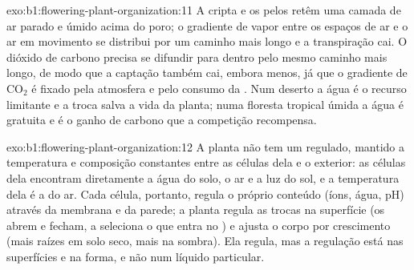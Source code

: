 \begin{solution}{exo:b1:flowering-plant-organization:11}
A cripta e os pelos retêm uma camada de ar parado e úmido acima do poro;
o gradiente de vapor entre os espaços de ar e o ar em movimento se
distribui por um caminho mais longo e a transpiração cai. O dióxido de
carbono precisa se difundir para dentro pelo mesmo caminho mais longo,
de modo que a captação também cai, embora menos, já que o gradiente de
$\mathrm{CO_2}$ é fixado pela atmosfera e pelo consumo da . Num
deserto a água é o recurso limitante e a troca salva a vida da planta;
numa floresta tropical úmida a água é gratuita e é o ganho de carbono
que a competição recompensa.
\end{solution}

\begin{solution}{exo:b1:flowering-plant-organization:12}
A planta não tem um  regulado, mantido a temperatura
e composição constantes entre as células dela e o exterior: as células
dela encontram diretamente a água do solo, o ar e a luz do sol, e a
temperatura dela é a do ar. Cada célula, portanto, regula o próprio
conteúdo (íons, água, pH) através da membrana e da parede; a planta
regula as trocas na superfície (os  abrem e fecham, a 
seleciona o que entra no ) e ajusta o corpo por crescimento (mais
raízes em solo seco, mais  na sombra). Ela regula, mas a regulação
está nas superfícies e na forma, e não num líquido particular.
\end{solution}

